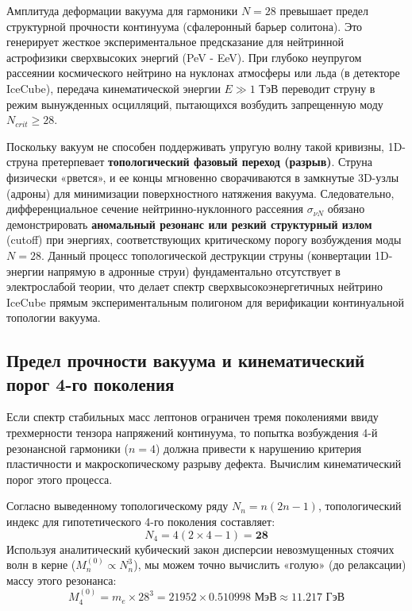 \documentclass[12pt,a4paper]{article}
\begin{document}
	Амплитуда деформации вакуума для гармоники $N=28$ превышает предел структурной прочности континуума (сфалеронный барьер солитона). Это генерирует жесткое экспериментальное предсказание для нейтринной астрофизики сверхвысоких энергий (PeV - EeV). 
	При глубоко неупругом рассеянии космического нейтрино на нуклонах атмосферы или льда (в детекторе IceCube), передача кинематической энергии $E \gg 1$ ТэВ переводит струну в режим вынужденных осцилляций, пытающихся возбудить запрещенную моду $N_{crit} \ge 28$.
	
	Поскольку вакуум не способен поддерживать упругую волну такой кривизны, 1D-струна претерпевает \textbf{топологический фазовый переход (разрыв)}. Струна физически «рвется», и ее концы мгновенно сворачиваются в замкнутые 3D-узлы (адроны) для минимизации поверхностного натяжения вакуума. 
	Следовательно, дифференциальное сечение нейтринно-нуклонного рассеяния $\sigma_{\nu N}$ обязано демонстрировать \textbf{аномальный резонанс или резкий структурный излом} (cutoff) при энергиях, соответствующих критическому порогу возбуждения моды $N=28$. Данный процесс топологической деструкции струны (конвертации 1D-энергии напрямую в адронные струи) фундаментально отсутствует в электрослабой теории, что делает спектр сверхвысокоэнергетичных нейтрино IceCube прямым экспериментальным полигоном для верификации континуальной топологии вакуума.
	
	\subsection{Предел прочности вакуума и кинематический порог 4-го поколения}
	Если спектр стабильных масс лептонов ограничен тремя поколениями ввиду трехмерности тензора напряжений континуума, то попытка возбуждения 4-й резонансной гармоники ($n=4$) должна привести к нарушению критерия пластичности и макроскопическому разрыву дефекта. Вычислим кинематический порог этого процесса.
	
	Согласно выведенному топологическому ряду $N_n = n(2n-1)$, топологический индекс для гипотетического 4-го поколения составляет:
	\begin{equation}
		N_4 = 4(2 \times 4 - 1) = \mathbf{28}
	\end{equation}
	Используя аналитический кубический закон дисперсии невозмущенных стоячих волн в керне ($M_n^{(0)} \propto N_n^3$), мы можем точно вычислить «голую» (до релаксации) массу этого резонанса:
	\begin{equation}
		M_4^{(0)} = m_e \times 28^3 = 21952 \times 0.510998 \text{ МэВ} \approx \mathbf{11.217 \text{ ГэВ}}
	\end{equation}
	
\end{document}
